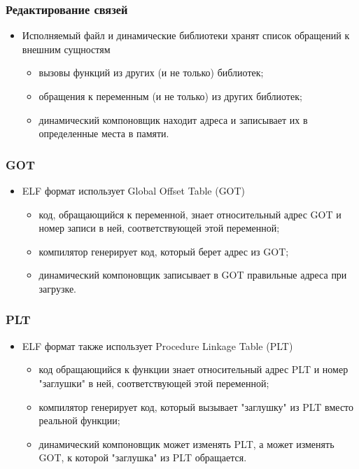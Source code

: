 \begin{frame}
\frametitle{Редактирование связей}
\begin{itemize}
    \item<1->Исполняемый файл и динамические библиотеки хранят список обращений
         к внешним сущностям
    \begin{itemize}
        \item<2->вызовы функций из других (и не только) библиотек;
        \item<3->обращения к переменным (и не только) из других библиотек;
        \item<4->динамический компоновщик находит адреса и записывает их в
             определенные места в памяти.
    \end{itemize}
\end{itemize}
\end{frame}

\begin{frame}
\frametitle{GOT}
\begin{itemize}
    \item<1->ELF формат использует Global Offset Table (GOT)
    \begin{itemize}
        \item<2->код, обращающийся к переменной, знает относительный адрес GOT
             и номер записи в ней, соответствующей этой переменной;
        \item<3->компилятор генерирует код, который берет адрес из GOT;
        \item<4->динамический компоновщик записывает в GOT правильные адреса
             при загрузке.
    \end{itemize}
\end{itemize}
\end{frame}

\begin{frame}
\frametitle{PLT}
\begin{itemize}
    \item<1->ELF формат также использует Procedure Linkage Table (PLT)
    \begin{itemize}
        \item<2->код обращающийся к функции знает относительный адрес PLT
             и номер "заглушки" в ней, соответствующей этой переменной;
        \item<3->компилятор генерирует код, который вызывает "заглушку" из PLT
             вместо реальной функции;
        \item<4->динамический компоновщик может изменять PLT, а может изменять
             GOT, к которой "заглушка" из PLT обращается.
    \end{itemize}
\end{itemize}
\end{frame}
